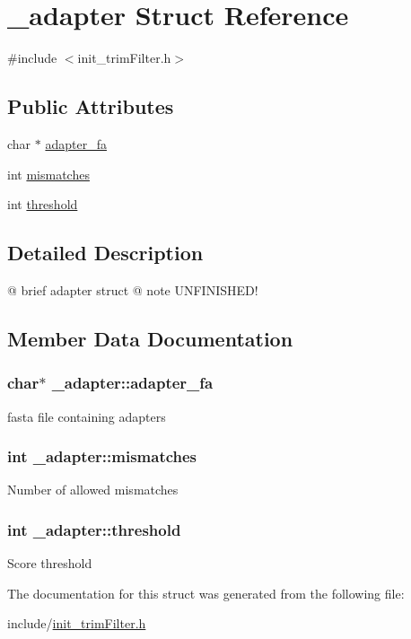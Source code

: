 \hypertarget{struct__adapter}{\section{\+\_\+adapter Struct Reference}
\label{struct__adapter}
}


{\ttfamily \#include $<$init\+\_\+trim\+Filter.\+h$>$}

\subsection*{Public Attributes}
\begin{DoxyCompactItemize}
\item 
char $\ast$ \hyperlink{struct__adapter_a8cce15db14580af09438241b8b5e0378}{adapter\+\_\+fa}
\item 
int \hyperlink{struct__adapter_a51c6998b13837c66f79b3a1dd3c11995}{mismatches}
\item 
int \hyperlink{struct__adapter_ad08512ea343076511d19f959bb6800e7}{threshold}
\end{DoxyCompactItemize}


\subsection{Detailed Description}
@ brief adapter struct @ note U\+N\+F\+I\+N\+I\+S\+H\+E\+D! 

\subsection{Member Data Documentation}
\hypertarget{struct__adapter_a8cce15db14580af09438241b8b5e0378}{
\subsubsection[{adapter\+\_\+fa}]{\setlength{\rightskip}{0pt plus 5cm}char$\ast$ \+\_\+adapter\+::adapter\+\_\+fa}}\label{struct__adapter_a8cce15db14580af09438241b8b5e0378}
fasta file containing adapters \hypertarget{struct__adapter_a51c6998b13837c66f79b3a1dd3c11995}{
\subsubsection[{mismatches}]{\setlength{\rightskip}{0pt plus 5cm}int \+\_\+adapter\+::mismatches}}\label{struct__adapter_a51c6998b13837c66f79b3a1dd3c11995}
Number of allowed mismatches \hypertarget{struct__adapter_ad08512ea343076511d19f959bb6800e7}{
\subsubsection[{threshold}]{\setlength{\rightskip}{0pt plus 5cm}int \+\_\+adapter\+::threshold}}\label{struct__adapter_ad08512ea343076511d19f959bb6800e7}
Score threshold 

The documentation for this struct was generated from the following file\+:\begin{DoxyCompactItemize}
\item 
include/\hyperlink{init__trimFilter_8h}{init\+\_\+trim\+Filter.\+h}\end{DoxyCompactItemize}
